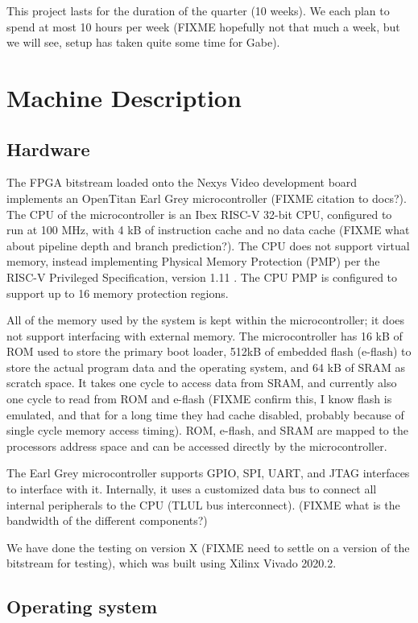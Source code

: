 \documentclass{article}
\begin{document}
This project lasts for the duration of the quarter (10 weeks). We each plan to spend at most 10 hours per week (FIXME hopefully not that much a week, but we will see, setup has taken quite some time for Gabe).

\section{Machine Description}

\subsection{Hardware}
The FPGA bitstream loaded onto the Nexys Video development board implements an OpenTitan Earl Grey microcontroller (FIXME citation to docs?). The CPU of the microcontroller is an Ibex RISC-V 32-bit CPU, configured to run at 100 MHz, with 4 kB of instruction cache and no data cache (FIXME what about pipeline depth and branch prediction?). The CPU does not support virtual memory, instead implementing Physical Memory Protection (PMP) per the RISC-V Privileged Specification, version 1.11 \cite{riscv-priv}. The CPU PMP is configured to support up to 16 memory protection regions.

All of the memory used by the system is kept within the microcontroller; it does not support interfacing with external memory. The microcontroller has 16 kB of ROM used to store the primary boot loader, 512kB of embedded flash (e-flash) to store the actual program data and the operating system, and 64 kB of SRAM as scratch space. It takes one cycle to access data from SRAM, and currently also one cycle to read from ROM and e-flash (FIXME confirm this, I know flash is emulated, and that for a long time they had cache disabled, probably because of single cycle memory access timing). ROM, e-flash, and SRAM are mapped to the processors address space and can be accessed directly by the microcontroller.

The Earl Grey microcontroller supports GPIO, SPI, UART, and JTAG interfaces to interface with it. Internally, it uses a customized data bus to connect all internal peripherals to the CPU (TLUL bus interconnect). (FIXME what is the bandwidth of the different components?)

We have done the testing on version X (FIXME need to settle on a version of the bitstream for testing), which was built using Xilinx Vivado 2020.2.

\subsection{Operating system}
\end{document}

